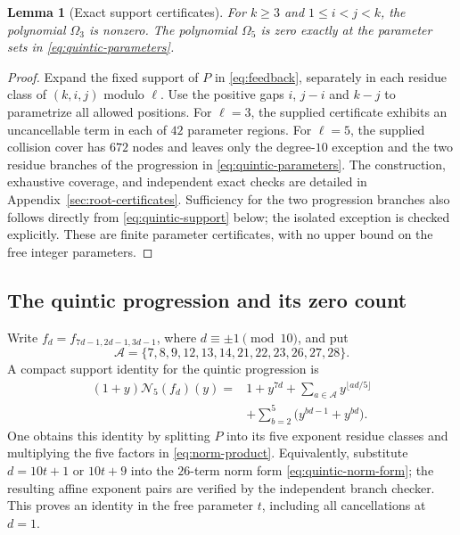 \documentclass[11pt]{article}
\newtheorem{lemma}[proposition]{Lemma}
\theoremstyle{definition}
\theoremstyle{remark}
\begin{document}
\begin{lemma}[Exact support certificates]\label{lem:norm-certificates}
For $k\ge3$ and $1\le i<j<k$, the polynomial $\Omega_3$ is nonzero.
The polynomial $\Omega_5$ is zero exactly at the parameter sets in
\eqref{eq:quintic-parameters}.
\end{lemma}
\begin{proof}
Expand the fixed support of $P$ in \eqref{eq:feedback}, separately
in each residue class of $(k,i,j)$ modulo $\ell$. Use the positive
gaps $i$, $j-i$ and $k-j$ to parametrize all allowed positions.
For $\ell=3$, the supplied certificate exhibits an uncancellable
term in each of $42$ parameter regions.
For $\ell=5$, the supplied collision cover has $672$ nodes and
leaves only the degree-$10$ exception and the two residue branches
of the progression in \eqref{eq:quintic-parameters}.
The construction, exhaustive coverage, and independent exact checks
are detailed in Appendix~\ref{sec:root-certificates}.
Sufficiency for the two progression branches also follows directly
from \eqref{eq:quintic-support} below; the isolated exception is
checked explicitly. These are finite parameter certificates, with
no upper bound on the free integer parameters.
\end{proof}

\subsection{The quintic progression and its zero count}
Write $f_d=f_{7d-1,2d-1,3d-1}$, where $d\equiv\pm1\pmod {10}$, and put
\[
 \mathcal A=\{7,8,9,12,13,14,21,22,23,26,27,28\}.
\]
A compact support identity for the quintic progression is
\begin{equation}\label{eq:quintic-support}
\begin{split}
 (1+y)\mathcal N_5(f_d)(y)
   ={}&1+y^{7d}
       +\sum_{a\in\mathcal A}y^{\lfloor ad/5\rfloor}\\
     &+\sum_{b=2}^{5}\bigl(y^{bd-1}+y^{bd}\bigr).
\end{split}
\end{equation}
One obtains this identity by splitting $P$ into its five exponent
residue classes and multiplying the five factors in
\eqref{eq:norm-product}. Equivalently, substitute
$d=10t+1$ or $10t+9$ into the $26$-term norm form
\eqref{eq:quintic-norm-form}; the resulting affine exponent pairs
are verified by the independent branch checker.
This proves an identity in the free parameter $t$, including
all cancellations at $d=1$.
\end{document}
